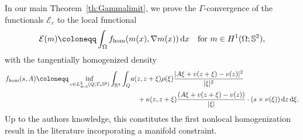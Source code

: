 \documentclass[reqno,11pt]{amsart}
\numberwithin{equation}{section}
\theoremstyle{thmlemcorr}
\numberwithin{theorem}{section}
\theoremstyle{thmlemcorr*}
\theoremstyle{defi}
\theoremstyle{remexample}
\theoremstyle{ass}
\newcommand{\R}{\mathbb{R}}
\renewcommand{\S}{\mathbb{S}}
\newcommand{\Ecal}{\mathcal{E}}
\newcommand{\Fcal}{\mathcal{F}}
\newcommand{\Hcal}{\mathcal{H}}
\renewcommand{\epsilon}{\varepsilon}
\newcommand{\dd}{\,\mathrm{d}}
\newcommand{\1}{\mathds{1}}
\newcommand{\Om}{\Omega}
\newcommand{\ROSS}[1]{{\textcolor{blue}{$\langle\hspace{-0.3ex}\langle$Ross: #1$\rangle\hspace{-0.3ex}\rangle$}}}
\begin{document}
In our main Theorem~\ref{th:Gammalimit}, we prove the $\Gamma$-convergence of the functionals $\Ecal_\epsilon$ to the local functional
\[
\Ecal(m)\coloneqq\int_{\Omega} f_{\rm hom}(m(x),\nabla m(x)) \dd x \quad \text{for $m \in H^1(\Omega;\S^2)$},
\]
with the tangentially homogenized density
\begin{align}
\begin{split}\label{eq:tan_hom_cell}
 f_{\rm hom}(s,A) 
\coloneqq\inf_{v \in L^2_{\#,0}(Q;T_s \S^2)}\int_{\R^3}\int_{Q}&a(z,z+\xi)\rho(\xi)\frac{|A\xi +v(z+\xi)-v(z)|^2}{|\xi|^2}\\
&\quad+\kappa(z,z+\xi)\frac{(A\xi+v(z+\xi)-v(z))}{|\xi|} \cdot(s \times \nu(\xi))\dd z \dd \xi.
\end{split}
\end{align}
Up to the authors knowledge, this constitutes the first nonlocal homogenization result in the literature incorporating a manifold constraint.





\end{document}

